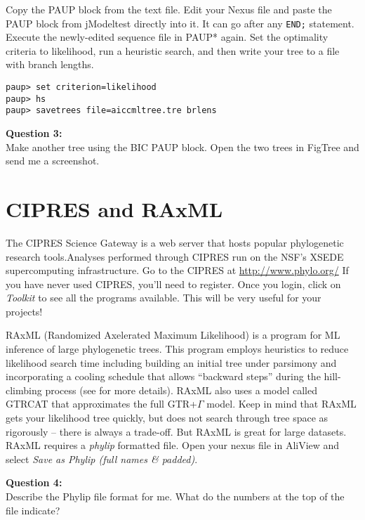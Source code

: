 \documentclass[11pt]{article}
\begin{document}
Copy the PAUP block from the text file.  
Edit your Nexus file and paste the PAUP block from jModeltest directly into it. 
It can go after any \texttt{END;} statement.  
Execute the newly-edited sequence file in PAUP* again.  
Set the optimality criteria to likelihood, run a heuristic search, and then write your tree to a file with branch lengths.

\begin{verbatim}
paup> set criterion=likelihood
paup> hs
paup> savetrees file=aiccmltree.tre brlens
\end{verbatim}

\begin{framed}
\noindent
\textbf{Question 3:} \\
Make another tree using the BIC PAUP block. Open the two trees in FigTree and send me a screenshot. 
\end{framed}


\section{CIPRES and RAxML}

The CIPRES Science Gateway is a web server that hosts popular phylogenetic research tools.Analyses performed through CIPRES run on the NSF's XSEDE supercomputing infrastructure.  
Go to the CIPRES at \url{http://www.phylo.org/}
If you have never used CIPRES, you'll need to register.
Once you login, click on \textit{Toolkit} to see all the programs available.
This will be very useful for your projects!

RAxML (Randomized Axelerated Maximum Likelihood) is a program for ML inference of large phylogenetic trees.  
This program employs heuristics to reduce likelihood search time including building an initial tree 
under parsimony and incorporating a cooling schedule that allows ``backward steps'' 
during the hill-climbing process (see \citet{stamatakis2005raxml} for more details).  
RAxML also uses a model called GTRCAT that approximates the full GTR+$\Gamma$ model.
Keep in mind that RAxML gets your likelihood tree quickly, 
but does not search through tree space as rigorously -- there is always a trade-off.
But RAxML is great for large datasets.
RAxML requires a \textit{phylip} formatted file. Open your nexus file
in AliView and select \textit{Save as Phylip (full names \& padded)}.

\begin{framed}
\noindent
\textbf{Question 4:} \\
Describe the Phylip file format for me.  What do the numbers at the top of the file indicate?
\end{framed}
\end{document}
